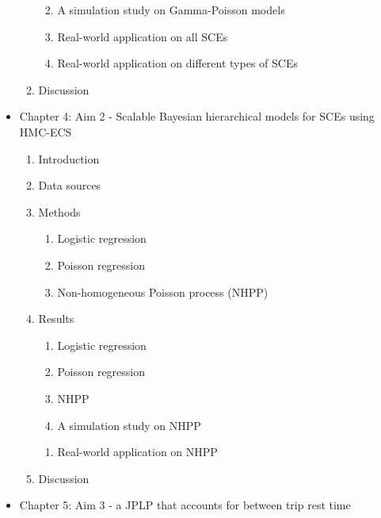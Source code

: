 \documentclass[12pt]{book}
\numberwithin{equation}{chapter}
\providecommand{\tightlist}{%
  \setlength{\itemsep}{0pt}\setlength{\parskip}{0pt}}
\begin{document}
\begin{itemize}
\begin{enumerate}
    \begin{enumerate}
    \def\labelenumii{\alph{enumii}.}
    \tightlist
    \item
      A simulation study on Gamma-Poisson models
    \item
      Real-world application on all SCEs
    \item
      Real-world application on different types of SCEs
    \end{enumerate}
  \item
    Discussion\\
  \end{enumerate}
\item
  Chapter 4: Aim 2 - Scalable Bayesian hierarchical models for SCEs using HMC-ECS

  \begin{enumerate}
  \def\labelenumi{\arabic{enumi}.}
  \tightlist
  \item
    Introduction
  \item
    Data sources
  \item
    Methods

    \begin{enumerate}
    \def\labelenumii{\alph{enumii}.}
    \tightlist
    \item
      Logistic regression
    \item
      Poisson regression
    \item
      Non-homogeneous Poisson process (NHPP)
    \end{enumerate}
  \item
    Results

    \begin{enumerate}
    \def\labelenumii{\alph{enumii}.}
    \tightlist
    \item
      Logistic regression
    \item
      Poisson regression
    \item
      NHPP
    \item
      A simulation study on NHPP
    \end{enumerate}

    \begin{enumerate}
    \def\labelenumii{\roman{enumii}.}
    \setcounter{enumii}{1}
    \tightlist
    \item
      Real-world application on NHPP
    \end{enumerate}
  \item
    Discussion
  \end{enumerate}
\item
  Chapter 5: Aim 3 - a JPLP that accounts for between trip rest time


\end{itemize}
\end{document}
